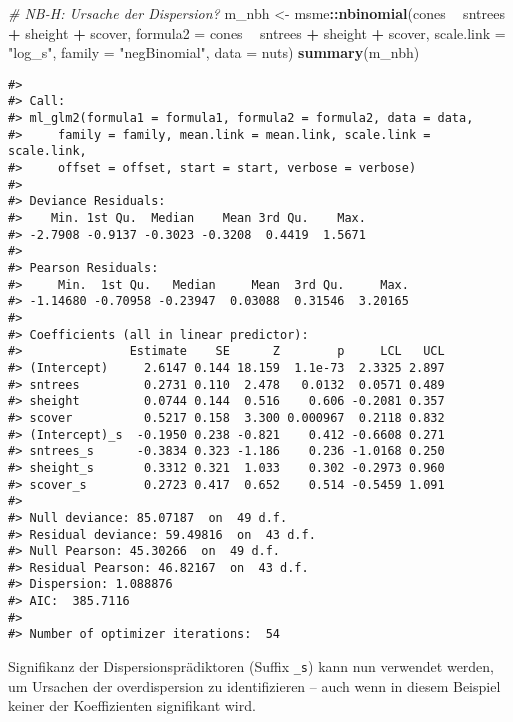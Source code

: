 \documentclass[ngerman,a4paper,]{scrartcl}
\newenvironment{Shaded}{\begin{snugshade}}{\end{snugshade}}
\newcommand{\CommentTok}[1]{\textcolor[rgb]{0.56,0.35,0.01}{\textit{#1}}}
\newcommand{\DataTypeTok}[1]{\textcolor[rgb]{0.13,0.29,0.53}{#1}}
\newcommand{\KeywordTok}[1]{\textcolor[rgb]{0.13,0.29,0.53}{\textbf{#1}}}
\newcommand{\NormalTok}[1]{#1}
\newcommand{\OperatorTok}[1]{\textcolor[rgb]{0.81,0.36,0.00}{\textbf{#1}}}
\newcommand{\StringTok}[1]{\textcolor[rgb]{0.31,0.60,0.02}{#1}}
\theoremstyle{definition}
\theoremstyle{definition}
\theoremstyle{definition}
\theoremstyle{remark}
\begin{document}
\begin{Shaded}
\begin{Highlighting}[]
\CommentTok{# NB-H: Ursache der Dispersion?}
\NormalTok{m_nbh <-}\StringTok{ }\NormalTok{msme}\OperatorTok{::}\KeywordTok{nbinomial}\NormalTok{(cones }\OperatorTok{~}\StringTok{ }\NormalTok{sntrees }\OperatorTok{+}\StringTok{ }\NormalTok{sheight }\OperatorTok{+}\StringTok{ }\NormalTok{scover, }
                         \DataTypeTok{formula2 =}\NormalTok{ cones }\OperatorTok{~}\StringTok{ }\NormalTok{sntrees }\OperatorTok{+}\StringTok{ }\NormalTok{sheight }\OperatorTok{+}\StringTok{ }\NormalTok{scover,}
                         \DataTypeTok{scale.link =} \StringTok{"log_s"}\NormalTok{,}
                         \DataTypeTok{family =} \StringTok{"negBinomial"}\NormalTok{,}
                         \DataTypeTok{data =}\NormalTok{ nuts)}
\KeywordTok{summary}\NormalTok{(m_nbh)}
\end{Highlighting}
\end{Shaded}

\begin{verbatim}
#> 
#> Call:
#> ml_glm2(formula1 = formula1, formula2 = formula2, data = data, 
#>     family = family, mean.link = mean.link, scale.link = scale.link, 
#>     offset = offset, start = start, verbose = verbose)
#> 
#> Deviance Residuals:
#>    Min. 1st Qu.  Median    Mean 3rd Qu.    Max. 
#> -2.7908 -0.9137 -0.3023 -0.3208  0.4419  1.5671 
#> 
#> Pearson Residuals:
#>     Min.  1st Qu.   Median     Mean  3rd Qu.     Max. 
#> -1.14680 -0.70958 -0.23947  0.03088  0.31546  3.20165 
#> 
#> Coefficients (all in linear predictor):
#>               Estimate    SE      Z        p     LCL   UCL
#> (Intercept)     2.6147 0.144 18.159  1.1e-73  2.3325 2.897
#> sntrees         0.2731 0.110  2.478   0.0132  0.0571 0.489
#> sheight         0.0744 0.144  0.516    0.606 -0.2081 0.357
#> scover          0.5217 0.158  3.300 0.000967  0.2118 0.832
#> (Intercept)_s  -0.1950 0.238 -0.821    0.412 -0.6608 0.271
#> sntrees_s      -0.3834 0.323 -1.186    0.236 -1.0168 0.250
#> sheight_s       0.3312 0.321  1.033    0.302 -0.2973 0.960
#> scover_s        0.2723 0.417  0.652    0.514 -0.5459 1.091
#> 
#> Null deviance: 85.07187  on  49 d.f.
#> Residual deviance: 59.49816  on  43 d.f.
#> Null Pearson: 45.30266  on  49 d.f.
#> Residual Pearson: 46.82167  on  43 d.f.
#> Dispersion: 1.088876
#> AIC:  385.7116
#> 
#> Number of optimizer iterations:  54
\end{verbatim}

Signifikanz der Dispersionsprädiktoren (Suffix \texttt{\_s}) kann nun verwendet werden, um Ursachen der overdispersion zu identifizieren -- auch wenn in diesem Beispiel keiner der Koeffizienten signifikant wird.
\end{document}

